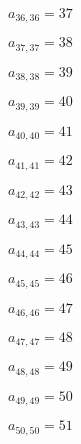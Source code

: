 \documentclass[a4paper,12pt]{article}
\begin{document}
$a _{ 36, 36 } = 37$

$a _{ 37, 37 } = 38$

$a _{ 38, 38 } = 39$

$a _{ 39, 39 } = 40$

$a _{ 40, 40 } = 41$

$a _{ 41, 41 } = 42$

$a _{ 42, 42 } = 43$

$a _{ 43, 43 } = 44$

$a _{ 44, 44 } = 45$

$a _{ 45, 45 } = 46$

$a _{ 46, 46 } = 47$

$a _{ 47, 47 } = 48$

$a _{ 48, 48 } = 49$

$a _{ 49, 49 } = 50$

$a _{ 50, 50 } = 51$
\end{document}
